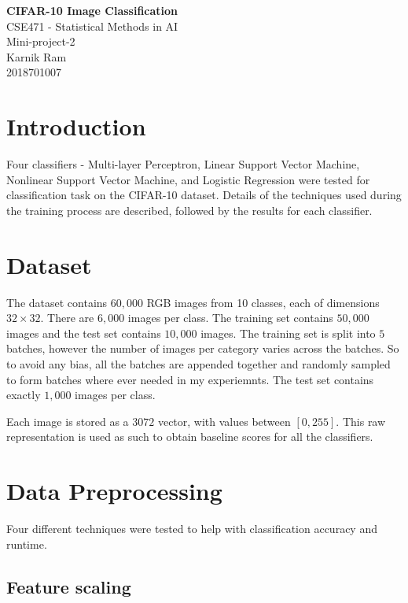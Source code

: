 \documentclass[12pt]{article}
\begin{document}
 \begin{center}
  \huge{\textbf{CIFAR-10 Image Classification}\\}
  \Large{CSE471 - Statistical Methods in AI}\\
  Mini-project-2\\
  \vspace{0.2in}
  Karnik Ram\\
  2018701007
 \end{center}
 
\section*{Introduction}

Four classifiers - Multi-layer Perceptron, Linear Support Vector Machine, Nonlinear Support Vector Machine, and Logistic Regression were tested for classification task on the CIFAR-10 dataset. Details of the techniques used during the training process are described, followed by the results for each classifier.

\section*{Dataset}

The dataset contains $60,000$ RGB images from 10 classes, each of dimensions $32 \times 32$. There are $6,000$ images per class. The training set contains $50,000$ images and the test set contains $10,000$ images. The training set is split into $5$ batches, however the number of images per category varies across the batches. So to avoid any bias, all the batches are appended together and randomly sampled to form batches where ever needed in my experiemnts. The test set contains exactly $1,000$ images per class.

Each image is stored as a $3072$ vector, with values between $[0,255]$. This raw representation is used as such to obtain baseline scores for all the classifiers.

\section*{Data Preprocessing}

Four different techniques were tested to help with classification accuracy and runtime.

\subsection*{Feature scaling}
\end{document}
